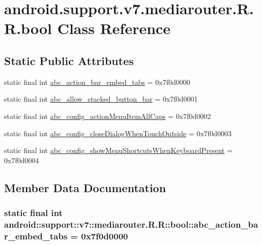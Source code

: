 \hypertarget{classandroid_1_1support_1_1v7_1_1mediarouter_1_1_r_1_1bool}{
\section{android.support.v7.mediarouter.R.R.bool Class Reference}
\label{classandroid_1_1support_1_1v7_1_1mediarouter_1_1_r_1_1bool}
}
\subsection*{Static Public Attributes}
\begin{CompactItemize}
\item 
static final int \hyperlink{classandroid_1_1support_1_1v7_1_1mediarouter_1_1_r_1_1bool_dcb18c39dd7610ecd8fcdb4dcd0eacf3}{abc\_\-action\_\-bar\_\-embed\_\-tabs} = 0x7f0d0000
\item 
static final int \hyperlink{classandroid_1_1support_1_1v7_1_1mediarouter_1_1_r_1_1bool_a1749eaafa249317eedb9d3dbaa0a169}{abc\_\-allow\_\-stacked\_\-button\_\-bar} = 0x7f0d0001
\item 
static final int \hyperlink{classandroid_1_1support_1_1v7_1_1mediarouter_1_1_r_1_1bool_606de56a1f2b53a1f6827671367f8e22}{abc\_\-config\_\-actionMenuItemAllCaps} = 0x7f0d0002
\item 
static final int \hyperlink{classandroid_1_1support_1_1v7_1_1mediarouter_1_1_r_1_1bool_95a6345583f4cf4e1f7b52c52239faa9}{abc\_\-config\_\-closeDialogWhenTouchOutside} = 0x7f0d0003
\item 
static final int \hyperlink{classandroid_1_1support_1_1v7_1_1mediarouter_1_1_r_1_1bool_f79fbd77635d57fa69b3160c34015a5d}{abc\_\-config\_\-showMenuShortcutsWhenKeyboardPresent} = 0x7f0d0004
\end{CompactItemize}


\subsection{Member Data Documentation}
\hypertarget{classandroid_1_1support_1_1v7_1_1mediarouter_1_1_r_1_1bool_dcb18c39dd7610ecd8fcdb4dcd0eacf3}{
\subsubsection[{abc\_\-action\_\-bar\_\-embed\_\-tabs}]{\setlength{\rightskip}{0pt plus 5cm}static final int android::support::v7::mediarouter.R.R::bool::abc\_\-action\_\-bar\_\-embed\_\-tabs = 0x7f0d0000}}
\label{classandroid_1_1support_1_1v7_1_1mediarouter_1_1_r_1_1bool_dcb18c39dd7610ecd8fcdb4dcd0eacf3}


